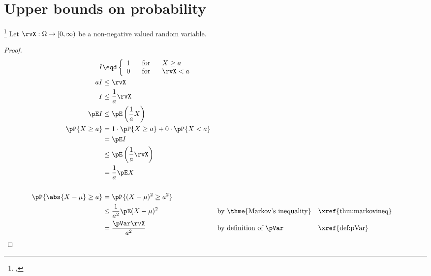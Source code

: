 \section{Upper bounds on probability}
\begin{theorem}
\footnote{
  ,
  }
\label{thm:markovineq}
\label{thm:chebyineq}
Let $\rvX:\Omega\to[0,\infty)$ be a non-negative valued random variable. %
\end{theorem}
\begin{proof}
\begin{align*}
  I &\eqd \left\{ \begin{array}{l@{\hspace{4ex}\mbox{for}\hspace{4ex}}l}
    1 & X\ge a \\
    0 &\rvX < a
    \end{array}\right.
\\
  aI &\le\rvX           \\
   I &\le \frac{1}{a}\rvX \\
   \pE I &\le \pE\left(\frac{1}{a} X\right) 
\\
   \pP{X\ge a}
     &= 1\cdot\pP{X\ge a} + 0\cdot\pP{X<a}
   \\&= \pE I
   \\&\le \pE\left(\frac{1}{a}\rvX \right)
   \\&=   \frac{1}{a}\pE X
  \\\\
  \pP{\abs{X-\mu} \ge a}
    &=   \pP{ (X-\mu)^2 \ge a^2}
  \\&\le \frac{1}{a^2} \pE(X-\mu)^2
    &&   \text{by \thme{Markov's inequality}}
    &&   \text{\xref{thm:markovineq}}
  \\&=   \frac{\pVar\rvX}{a^2}
    &&   \text{by definition of $\pVar$}
    &&   \text{\xref{def:pVar}}
\end{align*}
\end{proof}

